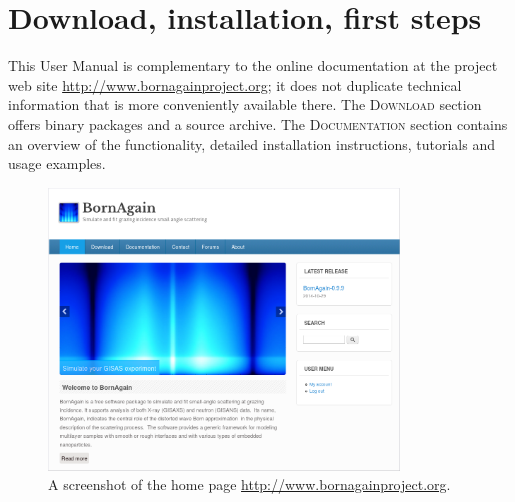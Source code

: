 

\newpage
\chapter{Download, installation, first steps} 

This User Manual is complementary to the online documentation
at the project web site \url{http://www.bornagainproject.org};
it does not duplicate technical information that is more conveniently
available there.
The \textsc{Download} section offers
binary packages and a source archive.
The \textsc{Documentation} section contains an overview
of the functionality,
detailed installation instructions,
tutorials and usage examples.

\begin{figure}[ht]
\begin{center}
\includegraphics[width=0.83\textwidth]{fig/screenshot/website.png}
\end{center}
\caption{A screenshot of the home page
         \url{http://www.bornagainproject.org}.}
\label{fig:website}
\end{figure}